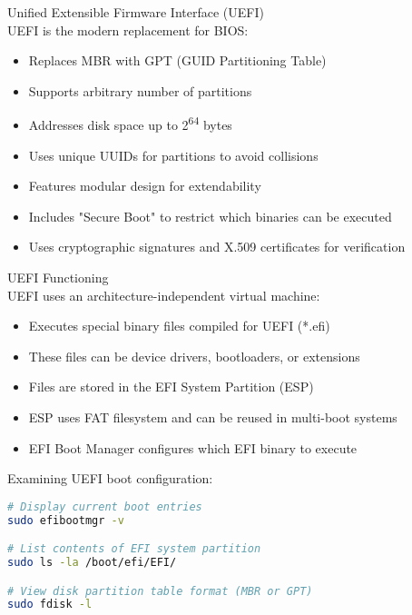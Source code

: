 \begin{definition}{Unified Extensible Firmware Interface (UEFI)}\\
    UEFI is the modern replacement for BIOS:
    \begin{itemize}
        \item Replaces MBR with GPT (GUID Partitioning Table)
        \item Supports arbitrary number of partitions
        \item Addresses disk space up to 2\textsuperscript{64} bytes
        \item Uses unique UUIDs for partitions to avoid collisions
        \item Features modular design for extendability
        \item Includes "Secure Boot" to restrict which binaries can be executed
        \item Uses cryptographic signatures and X.509 certificates for verification
    \end{itemize}
\end{definition}

\begin{definition}{UEFI Functioning}\\
    UEFI uses an architecture-independent virtual machine:
    \begin{itemize}
        \item Executes special binary files compiled for UEFI (*.efi)
        \item These files can be device drivers, bootloaders, or extensions
        \item Files are stored in the EFI System Partition (ESP)
        \item ESP uses FAT filesystem and can be reused in multi-boot systems
        \item EFI Boot Manager configures which EFI binary to execute
    \end{itemize}
\end{definition}

\begin{example}
    Examining UEFI boot configuration:
\begin{lstlisting}[language=bash, style=basesmol]
# Display current boot entries
sudo efibootmgr -v

# List contents of EFI system partition
sudo ls -la /boot/efi/EFI/

# View disk partition table format (MBR or GPT)
sudo fdisk -l
\end{lstlisting}
\end{example}

